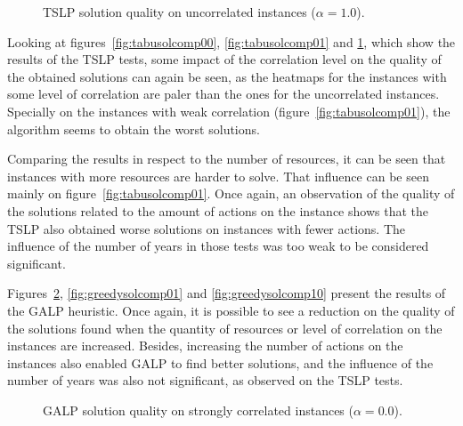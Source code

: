 \begin{figure}[H]
  \centering
  \resizebox{\columnwidth}{!}{%
    \subfloat[1 resource]{} 
    \subfloat[2 resources]{}
    \subfloat[4 resources]{}
  }
  \caption{TSLP solution quality on uncorrelated instances ($\alpha = 1.0$).}
  \label{fig:tabusolcomp10}
\end{figure}

Looking at figures~\ref{fig:tabusolcomp00}, \ref{fig:tabusolcomp01} and \ref{fig:tabusolcomp10}, which show the results of the TSLP tests, some impact of
the correlation level on the quality of the obtained solutions can again be seen, as the heatmaps for the instances with some level of correlation
are paler than the ones for the uncorrelated instances. Specially on the instances with weak correlation (figure~\ref{fig:tabusolcomp01}), the algorithm seems
to obtain the worst solutions.

Comparing the results in respect to the number of resources, it can be seen that instances with more resources are harder to solve. That influence
can be seen mainly on figure~\ref{fig:tabusolcomp01}. Once again, an observation of the quality of the solutions related to the amount of actions on the instance
shows that the TSLP also obtained worse solutions on instances with fewer actions. The influence of the number of years in those tests was too weak to be 
considered significant.

Figures~\ref{fig:greedysolcomp00}, \ref{fig:greedysolcomp01} and \ref{fig:greedysolcomp10} present the results of the GALP heuristic.
Once again, it is possible to see a reduction on the quality of the solutions found when the quantity of resources or level of correlation on
the instances are increased. Besides, increasing the number of actions on the instances also enabled GALP to find better solutions, and
the influence of the number of years was also not significant, as observed on the TSLP tests.

\begin{figure}[H]
  \centering
  \resizebox{\columnwidth}{!}{%
    \subfloat[1 resource]{} 
    \subfloat[2 resources]{}
    \subfloat[4 resources]{} 
  }
  \caption{GALP solution quality on strongly correlated instances ($\alpha = 0.0$).}
  \label{fig:greedysolcomp00}
\end{figure}

